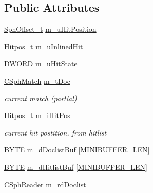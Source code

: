 \subsection*{Public Attributes}
\begin{DoxyCompactItemize}
\item 
\hyperlink{sphinx_8h_a0fb3b64afebef33c61367714754eaa90}{Sph\-Offset\-\_\-t} \hyperlink{classDiskIndexQwordTraits__c_a13ed7b9b1bea7c85a8f20e71a017f63a}{m\-\_\-u\-Hit\-Position}
\item 
\hyperlink{sphinx_8h_af1385e83d53e0648b15eae6d8f101847}{Hitpos\-\_\-t} \hyperlink{classDiskIndexQwordTraits__c_a1105d189e2bbe1465943ef11a81ab154}{m\-\_\-u\-Inlined\-Hit}
\item 
\hyperlink{sphinxstd_8h_a798af1e30bc65f319c1a246cecf59e39}{D\-W\-O\-R\-D} \hyperlink{classDiskIndexQwordTraits__c_ad9d809a5bca5eeca6503d9d58e6ef61e}{m\-\_\-u\-Hit\-State}
\item 
\hyperlink{classCSphMatch}{C\-Sph\-Match} \hyperlink{classDiskIndexQwordTraits__c_ae1176e7eb07c224d8b58608fbf3af360}{m\-\_\-t\-Doc}
\begin{DoxyCompactList}\small\item\em current match (partial) \end{DoxyCompactList}\item 
\hyperlink{sphinx_8h_af1385e83d53e0648b15eae6d8f101847}{Hitpos\-\_\-t} \hyperlink{classDiskIndexQwordTraits__c_af818c8369c578384f3093bcbca44cf9c}{m\-\_\-i\-Hit\-Pos}
\begin{DoxyCompactList}\small\item\em current hit postition, from hitlist \end{DoxyCompactList}\item 
\hyperlink{sphinxstd_8h_a4ae1dab0fb4b072a66584546209e7d58}{B\-Y\-T\-E} \hyperlink{classDiskIndexQwordTraits__c_a5b9ae75a635ba75969810253f56d3ee7}{m\-\_\-d\-Doclist\-Buf} \mbox{[}\hyperlink{classDiskIndexQwordTraits__c_aa83fb688cb8688383baf8ccaa2de2e06}{M\-I\-N\-I\-B\-U\-F\-F\-E\-R\-\_\-\-L\-E\-N}\mbox{]}
\item 
\hyperlink{sphinxstd_8h_a4ae1dab0fb4b072a66584546209e7d58}{B\-Y\-T\-E} \hyperlink{classDiskIndexQwordTraits__c_a27fe1fff67474b636fed940299e8bee2}{m\-\_\-d\-Hitlist\-Buf} \mbox{[}\hyperlink{classDiskIndexQwordTraits__c_aa83fb688cb8688383baf8ccaa2de2e06}{M\-I\-N\-I\-B\-U\-F\-F\-E\-R\-\_\-\-L\-E\-N}\mbox{]}
\item 
\hyperlink{classCSphReader}{C\-Sph\-Reader} \hyperlink{classDiskIndexQwordTraits__c_a1bd875b56456639db467b87e37449c0b}{m\-\_\-rd\-Doclist}

\end{DoxyCompactItemize}
